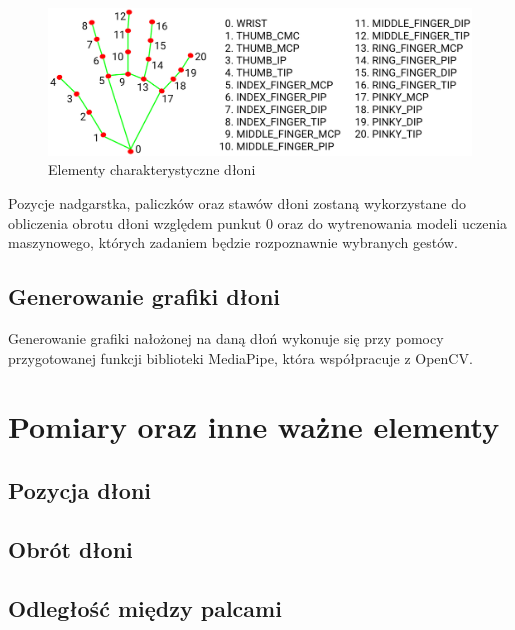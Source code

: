 \begin{figure}[H]
\begin{center}
    \includegraphics[width=15cm]{../images/hand_landmarks.png}
    \caption{Elementy charakterystyczne dłoni}
\end{center}
\end{figure}

\quad Pozycje nadgarstka, paliczków oraz stawów dłoni zostaną wykorzystane do obliczenia obrotu dłoni względem punkut 0 oraz do wytrenowania modeli uczenia maszynowego, których zadaniem będzie rozpoznawnie wybranych gestów. 

\subsection{Generowanie grafiki dłoni}

\quad Generowanie grafiki nałożonej na daną dłoń wykonuje się przy pomocy przygotowanej funkcji biblioteki MediaPipe, która współpracuje z OpenCV.   

\section{Pomiary oraz inne ważne elementy}

\subsection{Pozycja dłoni}

\subsection{Obrót dłoni}

\subsection{Odległość między palcami}



